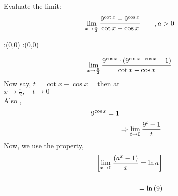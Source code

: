 


\newcommand{\ltpi}{\lim_{x \to \frac{\pi}{2}}}
\question Evaluate the limit: 
\begin{align}
\ltpi \dfrac{\vbone^{\cot x} - \vbone^{\cos x}}{\cot x - \cos x} \qquad ,a > 0   \notag
\end{align}


\watchout

\ifprintanswers
  \begin{marginfigure}
      :(0,0)
      :(0,0)
    \figdrawbegin{}
      \figdrawline [100,101]
    \figdrawend
    \figvisu{\figBoxA}{}{%
    }
    \centerline{\box\figBoxA}
  \end{marginfigure}
\fi 

\begin{solution}
\begin{align}
\ltpi  \dfrac{\vbone^{\cos x}\cdot\left(\vbone^{\cot x - \cos x} -1 \right)}{\cot x - \cos x}  
\end{align}
Now say, $t = \cot x - \cos x \quad$ then at\\
$x \rightarrow \frac{\pi}{2}, \quad t \rightarrow 0 $ \\
Also , 
\begin{align}
9^{\cos x} = 1 \notag \\
&\Rightarrow \lim_{t \to 0} \dfrac{9^{t} -1}{t} \\
\end{align}	
Now, we use the property,  
\begin{align}
\left[ \lim_{x \to 0} \dfrac{(a^x - 1)}{x} = \ln a \right] \notag \\
\notag \\
= \ln \left( 9 \right)   
\end{align}
\end{solution}


